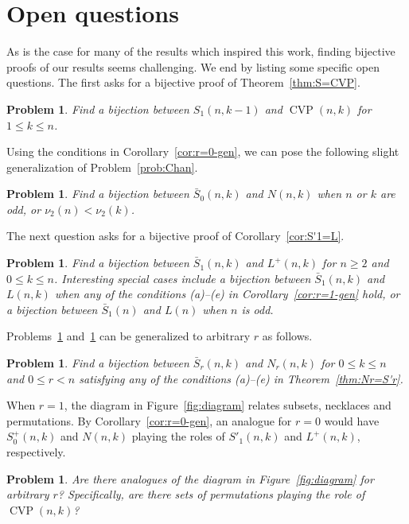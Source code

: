 \documentclass[12pt]{article}
\DeclareMathOperator{\CVP}{CVP}
\newcommand{\bS}{\bar{S}}
\newtheorem{problem}[theorem]{Problem}
\theoremstyle{definition}
\begin{document}
\section{Open questions}\label{sec:open}

As is the case for many of the results which inspired this work, finding bijective proofs of our results seems challenging. We end by listing some specific open questions. The first asks for a bijective proof of Theorem~\ref{thm:S=CVP}.

\begin{problem}
    Find a bijection between $S_1(n,k-1)$ and $\CVP(n,k)$ for $1\le k\le n$.
\end{problem}

Using the conditions in Corollary~\ref{cor:r=0-gen}, we can pose the following slight generalization of Problem~\ref{prob:Chan}.

\begin{problem}\label{prob:r=0}
    Find a bijection between $\bS_0(n, k)$ and $N(n, k)$ when $n$ or $k$ are odd, or $\nu_2(n)<\nu_2(k)$.
\end{problem}

The next question asks for a bijective proof of Corollary~\ref{cor:S'1=L}.

\begin{problem}\label{prob:r=1}
    Find a bijection between $\bS_1(n,k)$ and $L^+(n,k)$ for $n\ge2$ and $0\le k\le n$. Interesting special cases include a bijection between $\bS_1(n,k)$ and $L(n,k)$ when any of the conditions (a)--(e) in Corollary~\ref{cor:r=1-gen} hold, or a bijection between $\bS_1(n)$ and $L(n)$ when $n$ is odd.
\end{problem}

Problems~\ref{prob:r=0} and~\ref{prob:r=1} can be generalized to arbitrary $r$ as follows.

\begin{problem}
    Find a bijection between $\bS_r(n,k)$ and $N_r(n,k)$ for $0\le k\le n$ and
    $0\le r<n$ satisfying any of the conditions (a)--(e) in Theorem~\ref{thm:Nr=S'r}.
\end{problem}

When $r=1$, the diagram in Figure~\ref{fig:diagram} relates subsets, necklaces and permutations. By Corollary~\ref{cor:r=0-gen}, an analogue for $r = 0$ would have $S_0^+(n, k)$ and $N(n,k)$ playing the roles of $S'_1(n,k)$ and $L^+(n,k)$, respectively.

\begin{problem}
    Are there analogues of the diagram in Figure~\ref{fig:diagram} for arbitrary $r$? Specifically, are there sets of permutations playing the
    role of $\CVP(n, k)$?
\end{problem}
\end{document}
